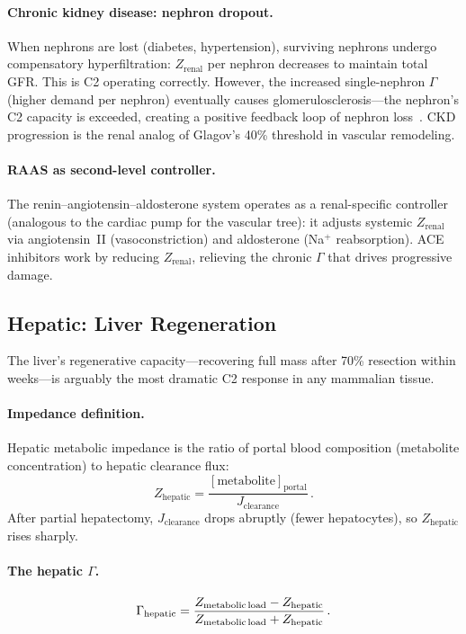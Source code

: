 \documentclass[aps,pre,twocolumn,superscriptaddress,floatfix]{revtex4-2}
\begin{document}
\paragraph{Chronic kidney disease: nephron dropout.}
When nephrons are lost (diabetes, hypertension),
surviving nephrons undergo compensatory hyperfiltration:
$Z_{\text{renal}}$ per nephron decreases to maintain
total GFR.  This is C2 operating correctly.
However, the increased single-nephron $\Gamma$
(higher demand per nephron) eventually causes
glomerulosclerosis---the nephron's C2 capacity is
exceeded, creating a positive feedback loop
of nephron loss~\cite{Brenner1982}.
CKD progression is the renal analog of Glagov's
40\% threshold in vascular remodeling.

\paragraph{RAAS as second-level controller.}
The renin--angiotensin--aldosterone system operates
as a renal-specific controller
(analogous to the cardiac pump for the vascular tree):
it adjusts systemic $Z_{\text{renal}}$ via
angiotensin~II (vasoconstriction) and aldosterone
(Na$^+$ reabsorption).  ACE inhibitors work by
reducing $Z_{\text{renal}}$, relieving the
chronic $\Gamma$ that drives progressive damage.


\subsection{Hepatic: Liver Regeneration}
\label{sec:hepatic}

The liver's regenerative capacity---recovering full mass
after 70\% resection within weeks---is arguably the most
dramatic C2 response in any mammalian tissue.

\paragraph{Impedance definition.}
Hepatic metabolic impedance is the ratio of portal
blood composition (metabolite concentration) to
hepatic clearance flux:
\begin{equation}
  Z_{\text{hepatic}} =
  \frac{[\text{metabolite}]_{\text{portal}}}
       {J_{\text{clearance}}}\,.
  \label{eq:z-hepatic}
\end{equation}
After partial hepatectomy, $J_{\text{clearance}}$
drops abruptly (fewer hepatocytes), so
$Z_{\text{hepatic}}$ rises sharply.

\paragraph{The hepatic $\Gamma$.}
\begin{equation}
  \Gamma_{\text{hepatic}} =
  \frac{Z_{\text{metabolic\,load}} - Z_{\text{hepatic}}}
       {Z_{\text{metabolic\,load}} + Z_{\text{hepatic}}}\,.
  \label{eq:gamma-hepatic}
\end{equation}
\end{document}
